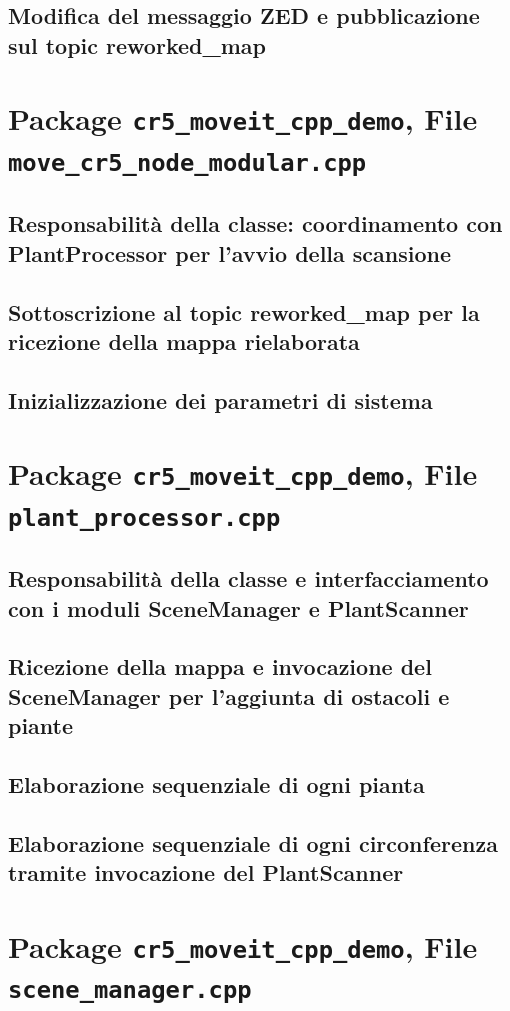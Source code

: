 \documentclass[12pt,a4paper,twoside,openright]{book}
\begin{document}
	\subsection{Modifica del messaggio ZED e pubblicazione sul topic reworked\_map}
	
	\section{Package \texttt{cr5\_moveit\_cpp\_demo}, File \texttt{move\_cr5\_node\_modular.cpp}}
	\subsection{Responsabilità della classe: coordinamento con PlantProcessor per l'avvio della scansione}
	\subsection{Sottoscrizione al topic reworked\_map per la ricezione della mappa rielaborata}
	\subsection{Inizializzazione dei parametri di sistema}
	
	\section{Package \texttt{cr5\_moveit\_cpp\_demo}, File \texttt{plant\_processor.cpp}}
	\subsection{Responsabilità della classe e interfacciamento con i moduli SceneManager e PlantScanner}
	\subsection{Ricezione della mappa e invocazione del SceneManager per l'aggiunta di ostacoli e piante}
	\subsection{Elaborazione sequenziale di ogni pianta}
	\subsection{Elaborazione sequenziale di ogni circonferenza tramite invocazione del PlantScanner}
	
	\section{Package \texttt{cr5\_moveit\_cpp\_demo}, File \texttt{scene\_manager.cpp}}
\end{document}
